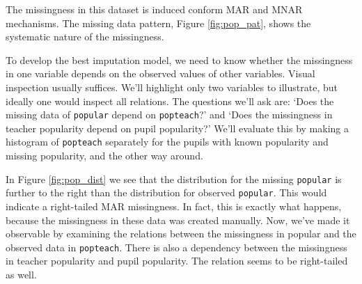 \documentclass[
]{jss}
\begin{document}
The missingness in this dataset is induced conform MAR and MNAR
mechanisms. The missing data pattern, Figure \ref{fig:pop_pat}, shows
the systematic nature of the missingness.

To develop the best imputation model, we need to know whether the
missingness in one variable depends on the observed values of other
variables. Visual inspection usually suffices. We'll highlight only two
variables to illustrate, but ideally one would inspect all relations.
The questions we'll ask are: `Does the missing data of \texttt{popular}
depend on \texttt{popteach}?' and `Does the missingness in teacher
popularity depend on pupil popularity?' We'll evaluate this by making a
histogram of \texttt{popteach} separately for the pupils with known
popularity and missing popularity, and the other way around.

In Figure \ref{fig:pop_dist} we see that the distribution for the
missing \texttt{popular} is further to the right than the distribution
for observed \texttt{popular}. This would indicate a right-tailed MAR
missingness. In fact, this is exactly what happens, because the
missingness in these data was created manually. Now, we've made it
observable by examining the relations between the missingness in popular
and the observed data in \texttt{popteach}. There is also a dependency
between the missingness in teacher popularity and pupil popularity. The
relation seems to be right-tailed as well.
\end{document}
